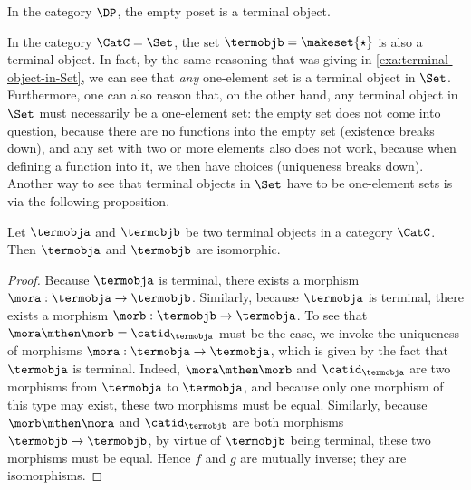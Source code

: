 \begin{example}\label{exa:term-obj-DP}
    In the category $\DP$, the empty poset is a terminal object.
\end{example}

\begin{remark}\label{rem:terminal-object-renaming}
    In the category $\CatC = \Set$, the set $\termobjb = \makeset{ \star}$ is also a terminal object.
    In fact, by the same reasoning that was giving in \cref{exa:terminal-object-in-Set}, we can see that \emph{any} one-element set is a terminal object in $\Set$.
    Furthermore, one can also reason that, on the other hand, any terminal object in $\Set$ must necessarily be a one-element set: the empty set does not come into question, because there are no functions into the empty set (existence breaks down), and any set with two or more elements  also does not work, because when defining a function into it, we then have choices (uniqueness breaks down).
    Another way to see that terminal objects in $\Set$ have to be one-element sets is via the following proposition.
\end{remark}

\begin{proposition}\label{prop:terminal-objs-isom}
    Let $\termobja$ and $\termobjb$ be two terminal objects in a category $\CatC$.
    Then $\termobja$ and $\termobjb$ are isomorphic.
\end{proposition}

\begin{proof}
    Because $\termobja$ is terminal, there exists a morphism $\mora : \termobja \to \termobjb$.
    Similarly, because $\termobja$ is terminal, there exists a morphism $\morb : \termobjb \to \termobja$.
    To see that $\mora \mthen \morb = \catid_\termobja$ must be the case, we invoke the uniqueness of morphisms $\mora : \termobja \to \termobja$, which is given by the fact that $\termobja$ is terminal.
    Indeed, $\mora \mthen \morb$ and $\catid_\termobja$ are two morphisms from $\termobja$ to $\termobja$, and because only one morphism of this type may exist, these two morphisms must be equal.
    Similarly, because $\morb \mthen \mora$ and $\catid_\termobjb$ are both morphisms $\termobjb \to \termobjb$, by virtue of $\termobjb$ being terminal, these two morphisms must be equal.
    Hence $f$ and $g$ are mutually inverse; they are isomorphisms.
\end{proof}


